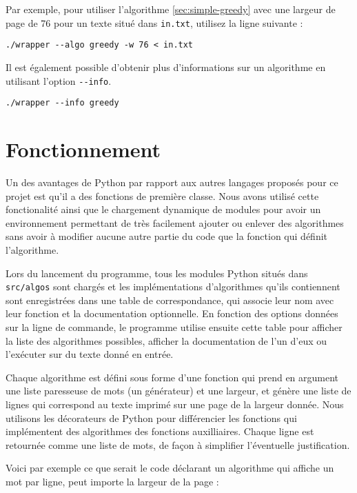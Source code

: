 \documentclass[a4paper, 11pt]{article}
\begin{document}
Par exemple, pour utiliser l'algorithme \ref{sec:simple-greedy} avec une largeur
de page de 76 pour un texte situé dans \verb|in.txt|, utilisez la ligne suivante
:

\begin{verbatim}
./wrapper --algo greedy -w 76 < in.txt
\end{verbatim}

Il est également possible d'obtenir plus d'informations sur un algorithme en
utilisant l'option \verb|--info|.

\begin{verbatim}
./wrapper --info greedy
\end{verbatim}

\section{Fonctionnement}

Un des avantages de Python par rapport aux autres langages proposés pour ce
projet est qu'il a des fonctions de première classe. Nous avons utilisé cette
fonctionalité ainsi que le chargement dynamique de modules pour avoir un
environnement permettant de très facilement ajouter ou enlever des algorithmes
sans avoir à modifier aucune autre partie du code que la fonction qui définit
l'algorithme.

Lors du lancement du programme, tous les modules Python situés dans
\verb|src/algos| sont chargés et les implémentations d'algorithmes qu'ils
contiennent sont enregistrées dans une table de correspondance, qui associe leur
nom avec leur fonction et la documentation optionnelle. En fonction
des options données sur la ligne de commande, le programme utilise ensuite cette
table pour afficher la liste des algorithmes possibles, afficher la
documentation de l'un d'eux ou l'exécuter sur du texte donné en entrée.

Chaque algorithme est défini sous forme d'une fonction qui prend en argument une
liste paresseuse de mots (un générateur) et une largeur, et génère une liste
de lignes qui correspond au texte imprimé sur une page de la largeur donnée.
Nous utilisons les décorateurs de Python pour différencier les fonctions qui
implémentent des algorithmes des fonctions auxilliaires. Chaque ligne est
retournée comme une liste de mots, de façon à simplifier l'éventuelle
justification.

Voici par exemple ce que serait le code déclarant un algorithme qui affiche un
mot par ligne, peut importe la largeur de la page :
\end{document}
